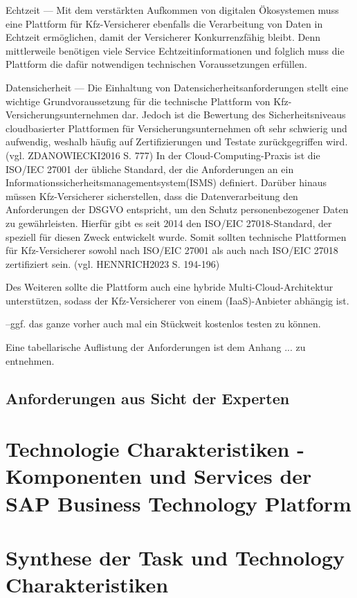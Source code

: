 Echtzeit --- Mit dem verstärkten Aufkommen von digitalen Ökosystemen muss eine Plattform für Kfz-Versicherer ebenfalls die Verarbeitung von Daten in Echtzeit ermöglichen, damit der Versicherer Konkurrenzfähig bleibt. Denn mittlerweile benötigen viele Service Echtzeitinformationen und folglich muss die Plattform die dafür notwendigen technischen Voraussetzungen erfüllen. 

Datensicherheit --- Die Einhaltung von Datensicherheitsanforderungen stellt eine wichtige Grundvoraussetzung für die technische Plattform von Kfz-Versicherungsunternehmen dar. Jedoch ist  die Bewertung des Sicherheitsniveaus cloudbasierter Plattformen für Versicherungsunternehmen oft sehr schwierig und aufwendig, weshalb häufig auf Zertifizierungen und Testate zurückgegriffen wird. (vgl. ZDANOWIECKI2016 S. 777) In der Cloud-Computing-Praxis ist die ISO/IEC 27001 der übliche Standard, der die Anforderungen an ein Informationssicherheitsmanagementsystem(ISMS) definiert. Darüber hinaus müssen Kfz-Versicherer sicherstellen, dass die Datenverarbeitung den Anforderungen der DSGVO entspricht, um den Schutz personenbezogener Daten zu gewährleisten. Hierfür gibt es seit 2014 den ISO/EIC 27018-Standard, der speziell für diesen Zweck entwickelt wurde. Somit sollten technische Plattformen für Kfz-Versicherer sowohl nach ISO/EIC 27001 als auch nach ISO/EIC 27018 zertifiziert sein. (vgl. HENNRICH2023 S. 194-196)

Des Weiteren sollte die Plattform auch eine hybride Multi-Cloud-Architektur unterstützen, sodass der Kfz-Versicherer von einem (IaaS)-Anbieter abhängig ist.

--ggf. das ganze vorher auch mal ein Stückweit kostenlos testen zu können.

Eine tabellarische Auflistung der Anforderungen ist dem Anhang ... zu entnehmen.











\subsection{Anforderungen aus Sicht der Experten}

\section{Technologie Charakteristiken - Komponenten und Services der SAP Business Technology Platform}\label{sec:TechCharak}

\section{Synthese der Task und Technology Charakteristiken}


